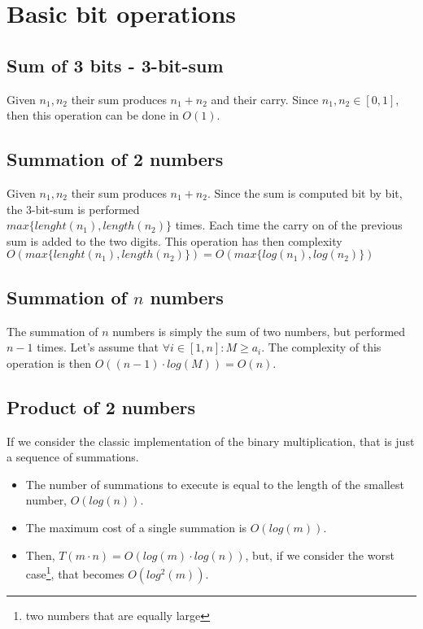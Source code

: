 \documentclass[12pt, a4paper, english]{report}
\begin{document}
\section{Basic bit operations}
\subsection{Sum of 3 bits - 3-bit-sum}
Given $n_{1}, n_{2}$ their sum produces $n_{1} + n_{2}$ and their carry. \newline
Since $n_{1}, n_{2} \in [0,1]$, then this operation can be done in $O(1)$.

\subsection{Summation of 2 numbers}
Given $n_{1}, n_{2}$ their sum produces $n_{1} + n_{2}$. \newline
Since the sum is computed bit by bit, the 3-bit-sum is performed\\$max\{lenght(n_{1}), length(n_{2})\}$ times.\newline
Each time the carry on of the previous sum is added to the two digits. \newline
This operation has then complexity $O(max\{lenght(n_{1}), length(n_{2})\}) = O(max\{log(n_{1}), log(n_{2})\})$

\subsection{Summation of $n$ numbers}
The summation of $n$ numbers is simply the sum of two numbers, but performed $n - 1$ times. \newline
Let's assume that $\forall i \in [1,n]: M \geq a_{i}$. \newline
The complexity of this operation is then $O((n-1) \cdot log(M)) = O(n)$. \newline

\subsection{Product of 2 numbers}
If we consider the classic implementation of the binary multiplication, that is just a sequence of summations. \newline
\begin{itemize}
    \item The number of summations to execute is equal to the length of the smallest number, $O(log(n))$.
    \item The maximum cost of a single summation is $O(log(m))$.
    \item Then, $T(m \cdot n) = O(log(m) \cdot log(n))$, but, if we consider the worst case\footnote{two numbers that are equally large}, that becomes $O(log^{2}(m))$.
\end{itemize}
\end{document}
